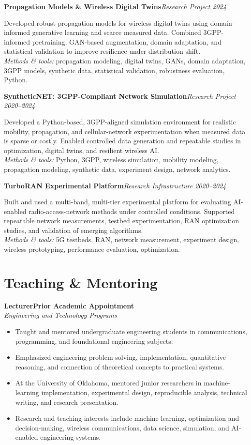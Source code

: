 \documentclass[9pt,letterpaper]{extarticle}
\newcommand{\role}[4]{\Needspace{4\baselineskip}\textbf{#1}\hfill\textbf{#2}\\[-1pt]\textit{#3}\hfill\textit{#4}\par}
\newcommand{\project}[3]{\Needspace{5\baselineskip}\textbf{#1}\hfill\textit{#2 \textbar{} #3}\par}
\begin{document}
\project{Propagation Models \& Wireless Digital Twins}{Research Project}{2024}
Developed robust propagation models for wireless digital twins using domain-informed generative learning and scarce measured data. Combined 3GPP-informed pretraining, GAN-based augmentation, domain adaptation, and statistical validation to improve resilience under distribution shift.\\[-1pt]
{\small\textit{Methods \& tools:} propagation modeling, digital twins, GANs, domain adaptation, 3GPP models, synthetic data, statistical validation, robustness evaluation, Python.}

\project{SyntheticNET: 3GPP-Compliant Network Simulation}{Research Project}{2020--2024}
Developed a Python-based, 3GPP-aligned simulation environment for realistic mobility, propagation, and cellular-network experimentation when measured data is sparse or costly. Enabled controlled data generation and repeatable studies in optimization, digital twins, and resilient wireless AI.\\[-1pt]
{\small\textit{Methods \& tools:} Python, 3GPP, wireless simulation, mobility modeling, propagation modeling, synthetic data, experiment design, network analytics.}

\project{TurboRAN Experimental Platform}{Research Infrastructure}{2020--2024}
Built and used a multi-band, multi-tier experimental platform for evaluating AI-enabled radio-access-network methods under controlled conditions. Supported repeatable network measurements, testbed experimentation, RAN optimization studies, and validation of emerging algorithms.\\[-1pt]
{\small\textit{Methods \& tools:} 5G testbeds, RAN, network measurement, experiment design, wireless prototyping, performance evaluation, optimization.}

\section{Teaching \& Mentoring}
\role{Lecturer}{Prior Academic Appointment}{Engineering and Technology Programs}{}
\begin{itemize}
\item Taught and mentored undergraduate engineering students in communications, programming, and foundational engineering subjects.
\item Emphasized engineering problem solving, implementation, quantitative reasoning, and connection of theoretical concepts to practical systems.
\end{itemize}
\begin{itemize}
\item At the University of Oklahoma, mentored junior researchers in machine-learning implementation, experimental design, reproducible analysis, technical writing, and research presentation.
\item Research and teaching interests include machine learning, optimization and decision-making, wireless communications, data science, simulation, and AI-enabled engineering systems.
\end{itemize}
\end{document}
